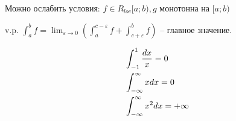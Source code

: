 \begin{Rem}
	Можно ослабить условия: $f \in R_{loc}[a;b), g$ монотонна на $[a;b)$
\end{Rem}

\begin{Def} 
	v.p. $\displaystyle \int_{a}^{b} f = \lim_{\varepsilon \to 0} \left(\int_{a}^{c-\varepsilon} f + \int_{c+\varepsilon}^{b} f  \right)$ -- главное значение.\\
\end{Def} 

\begin{Example}
	\begin{align*}
		\displaystyle &\int_{-1}^{1} \frac{dx}{x} = 0 \\
		\displaystyle &\int_{-\infty}^{\infty} x dx = 0 \\
		\displaystyle &\int_{-\infty}^{\infty} x^2 dx = +\infty
	\end{align*}
\end{Example}

